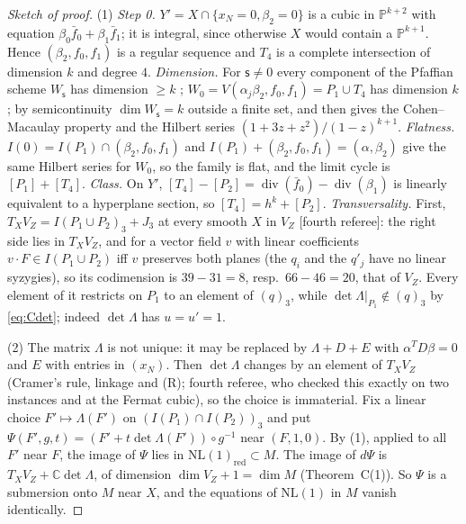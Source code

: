 \documentclass[10pt]{article}
\numberwithin{equation}{section}
\theoremstyle{remark}
\newcommand{\PP}{\mathbb{P}}
\newcommand{\CC}{\mathbb{C}}
\newcommand{\NL}{\mathrm{NL}}
\newcommand{\VZ}{V_Z}
\begin{document}
\begin{proof}[Sketch of proof]
(1) \emph{Step 0.} $Y'=X\cap\{x_N=0,\beta_2=0\}$ is a cubic in $\PP^{k+2}$ with equation
$\beta_0\bar f_0+\beta_1\bar f_1$; it is integral, since otherwise $X$ would contain a $\PP^{k+1}$. Hence
$(\beta_2,f_0,f_1)$ is a regular sequence and $T_4$ is a complete intersection of dimension $k$ and degree $4$.
\emph{Dimension.} For $\mathsf s\ne0$ every component of the Pfaffian scheme $W_{\mathsf s}$ has dimension
$\ge k$ \cite{BE}; $W_0=V(\alpha_j\beta_2,f_0,f_1)=P_1\cup T_4$ has dimension $k$; by semicontinuity
$\dim W_{\mathsf s}=k$ outside a finite set, and then \cite{BE} gives the Cohen--Macaulay property and the
Hilbert series $(1+3z+z^2)/(1-z)^{k+1}$. \emph{Flatness.} $I(0)=I(P_1)\cap(\beta_2,f_0,f_1)$ and
$I(P_1)+(\beta_2,f_0,f_1)=(\alpha,\beta_2)$ give the same Hilbert series for $W_0$, so the family is flat, and
the limit cycle is $[P_1]+[T_4]$. \emph{Class.} On $Y'$, $[T_4]-[P_2]=\operatorname{div}(\bar f_0)-
\operatorname{div}(\beta_1)$ is linearly equivalent to a hyperplane section, so $[T_4]=h^k+[P_2]$.
\emph{Transversality.} First, $T_X\VZ=I(P_1\cup P_2)_3+J_3$ at every smooth $X$ in $\VZ$ [fourth referee]: the
right side lies in $T_X\VZ$, and for a vector field $v$ with linear coefficients $v\cdot F\in I(P_1\cup P_2)$ iff
$v$ preserves both planes (the $q_i$ and the $q'_j$ have no linear syzygies), so its codimension is $39-31=8$,
resp.\ $66-46=20$, that of $\VZ$. Every element of it restricts on $P_1$ to an element of
$(q)_3$, while $\det\Lambda|_{P_1}\notin(q)_3$ by \eqref{eq:Cdet}; indeed $\det\Lambda$ has $u=u'=1$.

(2) The matrix $\Lambda$ is not unique: it may be replaced by $\Lambda+D+E$ with $\alpha^TD\beta=0$ and $E$
with entries in $(x_N)$. Then $\det\Lambda$ changes by an element of $T_X\VZ$ (Cramer's rule, linkage and (R);
fourth referee, who checked this exactly on two instances and at the Fermat cubic), so the choice is immaterial.
Fix a linear choice $F'\mapsto\Lambda(F')$ on $(I(P_1)\cap I(P_2))_3$ and put
$\Psi(F',g,t)=(F'+t\det\Lambda(F'))\circ g^{-1}$ near $(F,1,0)$. By (1), applied to all $F'$ near $F$, the image
of $\Psi$ lies in $\NL(1)_{\mathrm{red}}\subset M$. The image of $d\Psi$ is $T_X\VZ+\CC\det\Lambda$, of dimension
$\dim\VZ+1=\dim M$ (Theorem~C(1)). So $\Psi$ is a submersion onto $M$ near $X$, and the equations of $\NL(1)$
in $M$ vanish identically.
\end{proof}
\end{document}
